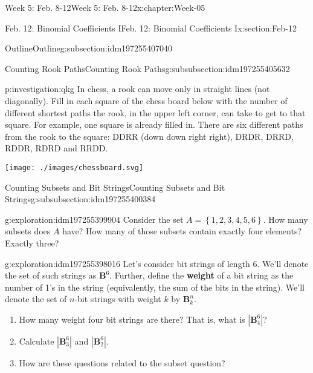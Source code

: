 \documentclass[oneside,10pt,]{book}
\newcommand{\terminology}[1]{\textbf{#1}}
\numberwithin{equation}{section}
\newcommand{\set}[1]{\left\{ {#1} \right\}}
\newcommand{\card}[1]{\left| #1 \right|}
\begin{document}
\begin{chapterptx}{Week 5: Feb. 8-12}{}{Week 5: Feb. 8-12}{}{}{x:chapter:Week-05}
\begin{sectionptx}{Feb. 12: Binomial Coefficients I}{}{Feb. 12: Binomial Coefficients I}{}{}{x:section:Feb-12}
\begin{subsectionptx}{Outline}{}{Outline}{}{}{g:subsection:idm197255407040}
\begin{subsubsectionptx}{Counting Rook Paths}{}{Counting Rook Paths}{}{}{g:subsubsection:idm197255405632}
\begin{investigation}{}{p:investigation:qkg}%
%
%
%
%
In chess, a rook can move only in straight lines (not diagonally). Fill in each square of the chess board below with the number of different shortest paths the rook, in the upper left corner, can take to get to that square. For example, one square is already filled in. There are six different paths from the rook to the square: DDRR (down down right right), DRDR, DRRD, RDDR, RDRD and RRDD.%
\begin{sidebyside}{1}{0.25}{0.25}{0}%
\begin{sbspanel}{0.5}%
\texttt{[image: ./images/chessboard.svg]}
\end{sbspanel}%
\end{sidebyside}%
\end{investigation}%
\end{subsubsectionptx}
%
%
\typeout{************************************************}
\typeout{************************************************}
%
\begin{subsubsectionptx}{Counting Subsets and Bit Strings}{}{Counting Subsets and Bit Strings}{}{}{g:subsubsection:idm197255400384}
\begin{exploration}{}{g:exploration:idm197255399904}%
Consider the set \(A=\set{1,2,3,4,5,6}\). How many subsets does \(A\) have? How many of those subsets contain exactly four elements? Exactly three?%
\end{exploration}%
\begin{exploration}{}{g:exploration:idm197255398016}%
Let's consider bit strings of length 6. We'll denote the set of such strings as \(\mathbf{B}^6\). Further, define the \terminology{weight} of a bit string as the number of 1's in the string (equivalently, the sum of the bits in the string). We'll denote the set of \(n\)-bit strings with weight \(k\) by \(\mathbf{B}^n_k\).%
%
\begin{enumerate}
\item{}How many weight four bit strings are there? That is, what is \(\card{\mathbf{B}^6_4}\)?%
\item{}Calculate \(\card{\mathbf{B}^6_3}\) and \(\card{\mathbf{B}^6_2}\).%
\item{}How are these questions related to the subset question?%
\end{enumerate}
\end{exploration}%

\end{subsubsectionptx}
\end{subsectionptx}
\end{sectionptx}
\end{chapterptx}
\end{document}
